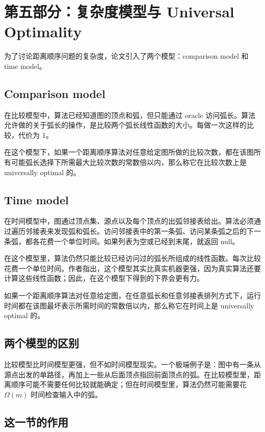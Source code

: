 \documentclass[UTF8]{ctexart}
\begin{document}
\section*{第五部分：复杂度模型与 Universal Optimality}

为了讨论距离顺序问题的复杂度，论文引入了两个模型：comparison model 和 time model。

\subsection*{Comparison model}

在比较模型中，算法已经知道图的顶点和弧，但只能通过 oracle 访问弧长。算法允许做的关于弧长的操作，是比较两个弧长线性函数的大小。每做一次这样的比较，代价为 1。

在这个模型下，如果一个距离顺序算法对任意给定图所做的比较次数，都在该图所有可能弧长选择下所需最大比较次数的常数倍以内，那么称它在比较次数上是 universally optimal 的。

\subsection*{Time model}

在时间模型中，图通过顶点集、源点以及每个顶点的出弧邻接表给出。算法必须通过遍历邻接表来发现弧和弧长。访问邻接表中的第一条弧、访问某条弧之后的下一条弧，都各花费一个单位时间。如果列表为空或已经到末尾，就返回 null。

在这个模型里，算法仍然只能比较已经访问过的弧长所组成的线性函数。每次比较花费一个单位时间。作者指出，这个模型其实比真实机器更强，因为真实算法还要计算这些线性函数；因此，在这个模型下得到的下界会更有力。

如果一个距离顺序算法对任意给定图，在任意弧长和任意邻接表排列方式下，运行时间都在该图最坏表示所需时间的常数倍以内，那么称它在时间上是 universally optimal 的。

\subsection*{两个模型的区别}

比较模型比时间模型更强，但不如时间模型现实。一个极端例子是：图中有一条从源点出发的单路径，再加上一些从后面顶点指回前面顶点的弧。在比较模型里，距离顺序可能不需要任何比较就能确定；但在时间模型里，算法仍然可能需要花 \(\Omega(m)\) 时间检查输入中的弧。

\subsection*{这一节的作用}
\end{document}
